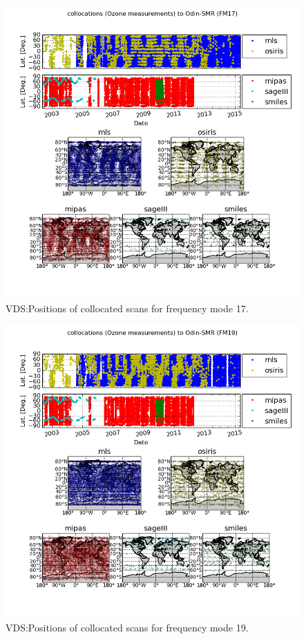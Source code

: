 \begin{figure}[t]
\centering
\includegraphics[width=17cm]{test_collocation_fm17.png}
\caption{VDS:Positions of collocated scans for frequency mode 17.}
\label{fig:vdsfm17}
\end{figure}



\begin{figure}[t]
\centering
\includegraphics[width=17cm]{test_collocation_fm19.png}
\caption{VDS:Positions of collocated scans for frequency mode 19.}
\label{fig:vdsfm19}
\end{figure}


